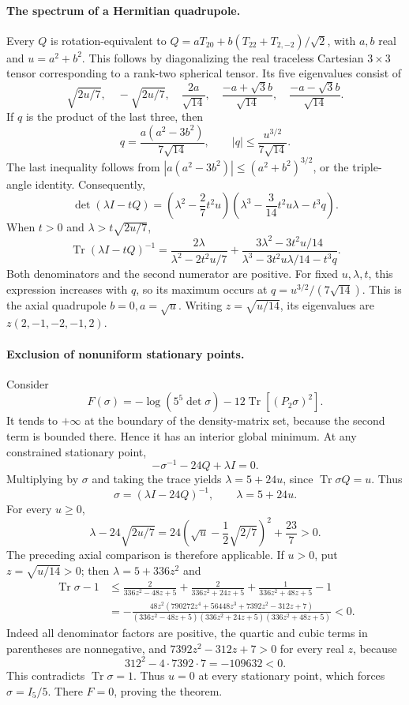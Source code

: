 \documentclass[11pt,a4paper]{article}
\newcommand{\Tr}{\operatorname{Tr}}
\begin{document}
\paragraph{The spectrum of a Hermitian quadrupole.}
Every $Q$ is rotation-equivalent to
$Q=aT_{20}+b(T_{22}+T_{2,-2})/\sqrt2$, with $a,b$ real and
$u=a^2+b^2$. This follows by diagonalizing the real traceless Cartesian
$3\times3$ tensor corresponding to a rank-two spherical tensor.
Its five eigenvalues consist of
\[
\sqrt{2u/7},\quad-\sqrt{2u/7},
\quad\frac{2a}{\sqrt{14}},
\quad\frac{-a+\sqrt3b}{\sqrt{14}},
\quad\frac{-a-\sqrt3b}{\sqrt{14}}.
\]
If $q$ is the product of the last three, then
\[
q=\frac{a(a^2-3b^2)}{7\sqrt{14}},\qquad
|q|\le\frac{u^{3/2}}{7\sqrt{14}}.
\]
The last inequality follows from
$|a(a^2-3b^2)|\le(a^2+b^2)^{3/2}$, or the triple-angle identity.
Consequently,
\[
\det(\lambda I-tQ)
 =\left(\lambda^2-\frac27t^2u\right)
  \left(\lambda^3-\frac3{14}t^2u\lambda-t^3q\right).
\]
When $t>0$ and $\lambda>t\sqrt{2u/7}$,
\[
\Tr(\lambda I-tQ)^{-1}
=\frac{2\lambda}{\lambda^2-2t^2u/7}
 +\frac{3\lambda^2-3t^2u/14}
 {\lambda^3-3t^2u\lambda/14-t^3q}.
\]
Both denominators and the second numerator are positive. For fixed
$u,\lambda,t$, this expression increases with $q$, so its maximum occurs
at $q=u^{3/2}/(7\sqrt{14})$. This is the axial quadrupole $b=0,a=\sqrt u$.
Writing $z=\sqrt{u/14}$, its eigenvalues are $z(2,-1,-2,-1,2)$.

\paragraph{Exclusion of nonuniform stationary points.}
Consider
\[
F(\sigma)=-\log(5^5\det\sigma)-12\Tr[(P_2\sigma)^2].
\]
It tends to $+\infty$ at the boundary of the density-matrix set, because
the second term is bounded there. Hence it has an interior global minimum.
At any constrained stationary point,
\[
-\sigma^{-1}-24Q+\lambda I=0.
\]
Multiplying by $\sigma$ and taking the trace yields $\lambda=5+24u$,
since $\Tr\sigma Q=u$. Thus
\[
\sigma=(\lambda I-24Q)^{-1},\qquad\lambda=5+24u.
\]
For every $u\ge0$,
\[
\lambda-24\sqrt{2u/7}
=24\left(\sqrt u-\frac12\sqrt{2/7}\right)^2+\frac{23}{7}>0.
\]
The preceding axial comparison is therefore applicable. If $u>0$,
put $z=\sqrt{u/14}>0$; then $\lambda=5+336z^2$ and
\begin{align*}
\Tr\sigma-1
&\le\frac2{336z^2-48z+5}
 +\frac2{336z^2+24z+5}
 +\frac1{336z^2+48z+5}-1\\
&=-\frac{48z^2\left(790272z^4+56448z^3+7392z^2-312z+7\right)}
 {(336z^2-48z+5)(336z^2+24z+5)(336z^2+48z+5)}<0.
\end{align*}
Indeed all denominator factors are positive, the quartic and cubic terms
in parentheses are nonnegative, and
$7392z^2-312z+7>0$ for every real $z$, because
\[
312^2-4\cdot7392\cdot7=-109632<0.
\]
This contradicts $\Tr\sigma=1$. Thus $u=0$ at every stationary point,
which forces $\sigma=I_5/5$. There $F=0$, proving the theorem.
\end{document}
